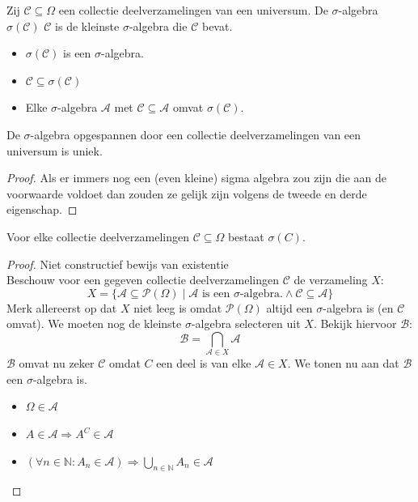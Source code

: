 \documentclass[main.tex]{subfiles}
\begin{document}
\begin{de}
  Zij $\mathcal{C} \subseteq \Omega$ een collectie deelverzamelingen van een universum.
  De $\sigma$-algebra $\sigma(\mathcal{C})$  $\mathcal{C}$ is de kleinste $\sigma$-algebra die $\mathcal{C}$ bevat.

  \begin{itemize}
  \item $\sigma(\mathcal{C})$ is een $\sigma$-algebra.
  \item $\mathcal{C} \subseteq \sigma(\mathcal{C})$
  \item Elke $\sigma$-algebra $\mathcal{A}$ met $\mathcal{C} \subseteq \mathcal{A}$ omvat $\sigma(\mathcal{C})$.
  \end{itemize}
\end{de}

\begin{st}
  De $\sigma$-algebra opgespannen door een collectie deelverzamelingen van een universum is uniek.

  \begin{proof}
    Als er immers nog een (even kleine) sigma algebra zou zijn die aan de voorwaarde voldoet dan zouden ze gelijk zijn volgens de tweede en derde eigenschap.
  \end{proof}
\end{st}

\begin{ei}
  Voor elke collectie deelverzamelingen $\mathcal{C} \subseteq \Omega$ bestaat $\sigma(C)$.

  \begin{proof}
    Niet constructief bewijs van existentie\\
    Beschouw voor een gegeven collectie deelverzamelingen $\mathcal{C}$ de verzameling $X$:
    \[ X = \{ \mathcal{A} \subseteq \mathcal{P}(\Omega) \mid \mathcal{A} \text{ is een $\sigma$-algebra.} \wedge \mathcal{C} \subseteq \mathcal{A} \} \]
    Merk allereerst op dat $X$ niet leeg is omdat $\mathcal{P}(\Omega)$ altijd een $\sigma$-algebra is (en $\mathcal{C}$ omvat).
    We moeten nog de kleinste $\sigma$-algebra selecteren uit $X$.
    Bekijk hiervoor $\mathcal{B}$:
    \[ \mathcal{B} = \bigcap_{\mathcal{A} \in X}\mathcal{A} \]
    $\mathcal{B}$ omvat nu zeker $\mathcal{C}$ omdat $C$ een deel is van elke $\mathcal{A} \in X$.
    We tonen nu aan dat $\mathcal{B}$ een $\sigma$-algebra is.
    \begin{itemize}
    \item $\Omega \in \mathcal{A}$
    \item $A \in \mathcal{A} \Rightarrow A^{C} \in \mathcal{A}$
    \item $(\forall n\in \mathbb{N}: A_{n}\in \mathcal{A}) \Rightarrow \bigcup_{n\in \mathbb{N}} A_{n} \in \mathcal{A}$
    \end{itemize}
  \end{proof}
\end{ei}
\end{document}
